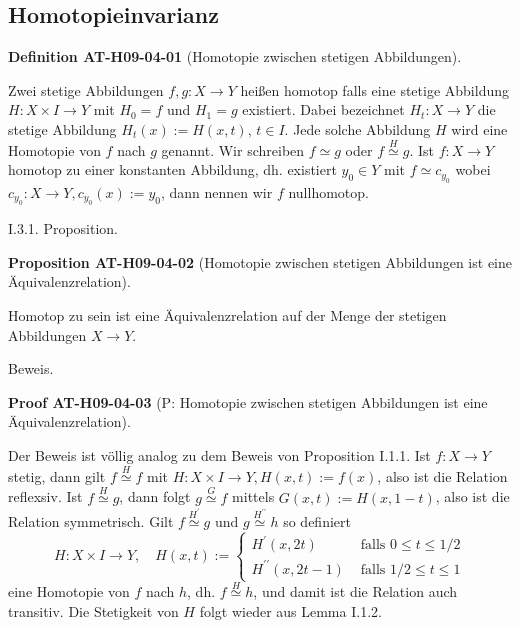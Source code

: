 \documentclass[10pt, letterpaper]{article}
\newcommand{\CustomHeading}[3]{%
  \par\medskip\noindent%
  \textbf{#1 #2} \textnormal{(#3)}.\enskip%
}
\newenvironment{DEF}[2]{\begin{unitbox}\CustomHeading{Definition}{#1}{#2}}{\end{unitbox}}
\newenvironment{PROP}[2]{\begin{unitbox}\CustomHeading{Proposition}{#1}{#2}}{\end{unitbox}}
\newenvironment{PROOF}[2]{\begin{unitbox}\CustomHeading{Proof}{#1}{#2}}{\end{unitbox}}
\begin{document}
\pagebreak



\subsection{Homotopieinvarianz}




\begin{DEF}{AT-H09-04-01}{Homotopie zwischen stetigen Abbildungen}
Zwei stetige Abbildungen $f, g: X \rightarrow Y$ heißen homotop falls eine stetige Abbildung $H: X \times I \rightarrow Y$ mit $H_{0}=f$ und $H_{1}=g$ existiert. Dabei bezeichnet $H_{t}: X \rightarrow Y$ die stetige Abbildung $H_{t}(x):=H(x, t)$, $t \in I$. Jede solche Abbildung $H$ wird eine Homotopie von $f$ nach $g$ genannt. Wir schreiben $f \simeq g$ oder $f \stackrel{H}{\simeq} g$. Ist $f: X \rightarrow Y$ homotop zu einer konstanten Abbildung, dh. existiert $y_{0} \in Y$ mit $f \simeq c_{y_{0}}$ wobei $c_{y_{0}}: X \rightarrow Y, c_{y_{0}}(x):=y_{0}$, dann nennen wir $f$ nullhomotop.
\end{DEF}



I.3.1. Proposition. 

\begin{PROP}{AT-H09-04-02}{Homotopie zwischen stetigen Abbildungen ist eine Äquivalenzrelation}
Homotop zu sein ist eine Äquivalenzrelation auf der Menge der stetigen Abbildungen $X \rightarrow Y$.
\end{PROP}

Beweis. 

\begin{PROOF}{AT-H09-04-03}{P: Homotopie zwischen stetigen Abbildungen ist eine Äquivalenzrelation}
Der Beweis ist völlig analog zu dem Beweis von Proposition I.1.1. Ist $f: X \rightarrow Y$ stetig, dann gilt $f \stackrel{H}{\simeq} f$ mit $H: X \times I \rightarrow Y, H(x, t):=f(x)$, also ist die Relation reflexsiv. Ist $f \stackrel{H}{\simeq} g$, dann folgt $g \stackrel{G}{\simeq} f$ mittels $G(x, t):=H(x, 1-t)$, also ist die Relation symmetrisch. Gilt $f \stackrel{H^{\prime}}{\simeq} g$ und $g \stackrel{H^{\prime \prime}}{\simeq} h$ so definiert
$$
H: X \times I \rightarrow Y, \quad H(x, t):= \begin{cases}H^{\prime}(x, 2 t) & \text { falls } 0 \leq t \leq 1 / 2 \\ H^{\prime \prime}(x, 2 t-1) & \text { falls } 1 / 2 \leq t \leq 1\end{cases}
$$
eine Homotopie von $f$ nach $h$, dh. $f \stackrel{H}{\simeq} h$, und damit ist die Relation auch transitiv. Die Stetigkeit von $H$ folgt wieder aus Lemma I.1.2.
\end{PROOF}
\end{document}
